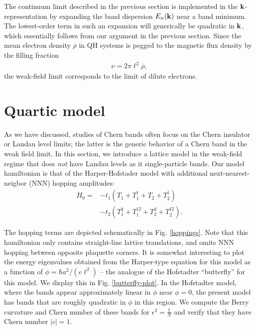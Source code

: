 \documentclass[aps,prb,twocolumn,letterpaper,twoside,nobalancelastpage,groupedaddress,amsmath,amssymb,floatfix,citeautoscript]{revtex4-1}
\begin{document}

The continuum limit described in the previous section is implemented in the ${\bf k}$-representation by expanding the band dispersion $E_{n}({\bf k})$ near a band minimum. The lowest-order term in such an expansion will generically be quadratic in ${\bf k}$, which essentially follows from our argument in the previous section. Since the mean electron density $\overline{\rho}$ in QH systems is pegged to the magnetic flux density by the filling fraction
\begin{align*}
\nu = 2\pi \ell^2 \overline{\rho},
\end{align*}
the weak-field limit corresponds to the limit of dilute electrons.  



\section{Quartic model}
As we have discussed, studies of Chern bands often focus on the Chern insulator or Landau level limits; the latter is the generic behavior of a Chern band in the weak field limit. In this section, we introduce a lattice model in the weak-field regime that does \textit{not} have Landau levels as it single-particle bands. Our model hamiltonian is that of the Harper-Hofstader model with additional next-nearest-neigbor (NNN) hopping amplitudes:
\begin{align*}
H_0 = &-t_1 \left(T_1 + T_1^{\dag} + T_2 + T_2^{\dag}\right)\\ &- t_2 \left(T_1^{2} + T_1^{\dag 2} + T_2^{2} + T_2^{\dag 2}\right).
\end{align*}

The hopping terms are depicted schematically in Fig. \ref{hoppings}. Note that this hamiltonian only contains straight-line lattice translations, and omits NNN hopping between opposite plaquette corners. It is somewhat interesting to plot the energy eigenvalues obtained from the Harper-type equation for this model as a function of $\phi = \hbar a^2/(e \ell^2)$ -- the analogue of the Hofstadter ``butterfly'' for this model\cite{Hofstadter:1976js}. We display this in Fig. \ref{butterfly-plot}. In the Hofstadter model, where the bands appear approximately linear in $\phi$ near $\phi = 0$, the present model has bands that are roughly quadratic in $\phi$ in this region. We compute the Berry curvature and Chern number of these bands for $\epsilon^2 = \frac{1}{N}$ and verify that they have Chern number $|c| = 1$.
\end{document}
